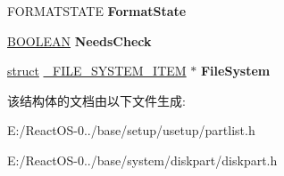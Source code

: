 \begin{DoxyCompactItemize}
F\+O\+R\+M\+A\+T\+S\+T\+A\+TE {\bfseries Format\+State}
\item 
\mbox{\label{struct___p_a_r_t_e_n_t_r_y_abfb45751d6fe52936a77f98260f6addb}} 
\hyperlink{_processor_bind_8h_a112e3146cb38b6ee95e64d85842e380a}{B\+O\+O\+L\+E\+AN} {\bfseries Needs\+Check}
\item 
\mbox{\label{struct___p_a_r_t_e_n_t_r_y_accdd4a015bf11a3d956db770ddd27d0e}} 
\hyperlink{interfacestruct}{struct} \hyperlink{struct___f_i_l_e___s_y_s_t_e_m___i_t_e_m}{\+\_\+\+F\+I\+L\+E\+\_\+\+S\+Y\+S\+T\+E\+M\+\_\+\+I\+T\+EM} $\ast$ {\bfseries File\+System}
\end{DoxyCompactItemize}


该结构体的文档由以下文件生成\+:\begin{DoxyCompactItemize}
\item 
E\+:/\+React\+O\+S-\/0../base/setup/usetup/partlist.\+h\item 
E\+:/\+React\+O\+S-\/0../base/system/diskpart/diskpart.\+h\end{DoxyCompactItemize}
